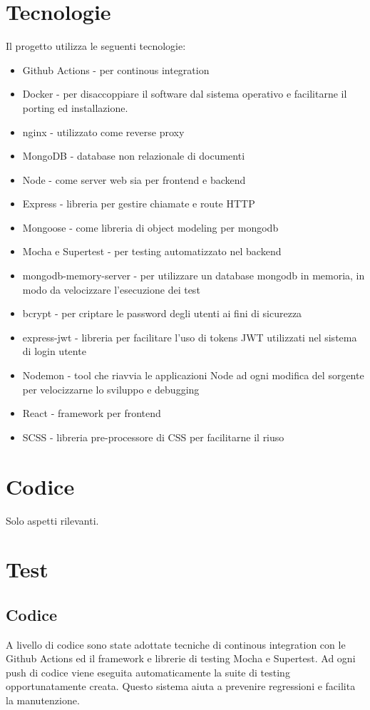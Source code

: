 \documentclass{report}
\begin{document}
\section{Tecnologie}
Il progetto utilizza le seguenti tecnologie:
\begin{itemize}
    \item Github Actions - per continous integration
    \item Docker - per disaccoppiare il software dal sistema operativo e facilitarne il porting ed installazione.
    \item nginx - utilizzato come reverse proxy
    \item MongoDB - database non relazionale di documenti
    \item Node - come server web sia per frontend e backend
    \item Express - libreria per gestire chiamate e route HTTP
    \item Mongoose - come libreria di object modeling per mongodb
    \item Mocha e Supertest - per testing automatizzato nel backend
    \item mongodb-memory-server - per utilizzare un database mongodb in memoria, in modo da velocizzare l'esecuzione dei test
    \item bcrypt - per criptare le password degli utenti ai fini di sicurezza
    \item express-jwt - libreria per facilitare l'uso di tokens JWT utilizzati nel sistema di login utente
    \item Nodemon - tool che riavvia le applicazioni Node ad ogni modifica del sorgente
    per velocizzarne lo sviluppo e debugging
    \item React - framework per frontend
    \item SCSS - libreria pre-processore di CSS per facilitarne il riuso
\end{itemize}

\section{Codice}
Solo aspetti rilevanti.

\section{Test}
\subsection{Codice}
A livello di codice sono state adottate tecniche di continous integration con le Github Actions ed il framework e librerie di testing
Mocha e Supertest.
Ad ogni push di codice viene eseguita automaticamente la suite di testing opportunatamente creata.
Questo sistema aiuta a prevenire regressioni e facilita la manutenzione.
\end{document}
